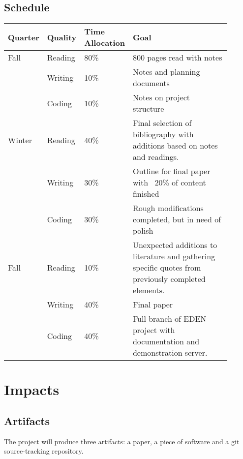 \documentclass[a4paper,man,natbib]{apa6}
\begin{document}
   \subsection*{Schedule}
   \begin{center}
   \begin{tabular}{|l|p{0.1\linewidth}|p{0.1\linewidth}|p{0.7\linewidth}|}
   \hline
   Quarter & Quality & Time Allocation & Goal                         \\ \hline
   Fall    & Reading & 80\%            & 800 pages read with notes    \\ \cline{2-4} 
           & Writing & 10\%            & Notes and planning documents \\ \cline{2-4} 
           & Coding  & 10\%            & Notes on project structure   \\ \hline 
   Winter  & Reading & 40\%            & Final selection of bibliography with additions based on notes and readings.   \\ \cline{2-4} 
           & Writing & 30\%            & Outline for final paper with ~20\% of content finished \\ \cline{2-4} 
           & Coding  & 30\%            & Rough modifications completed, but in need of polish  \\ \hline
   Fall    & Reading & 10\%            & Unexpected additions to literature and gathering specific quotes from previously completed elements.   \\ \cline{2-4} 
           & Writing & 40\%            & Final paper \\ \cline{2-4}
           & Coding  & 40\%            & Full branch of EDEN project with documentation and demonstration server. \\ \hline
   \end{tabular}
   \end{center}
   \section*{Impacts}
   \subsection*{Artifacts}
   The project will produce three artifacts: a paper, a piece of software and a git source-tracking repository.
\end{document}
